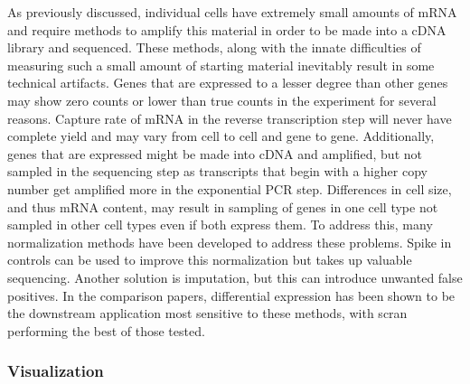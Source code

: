 \par{
As previously discussed, individual cells have extremely small amounts of mRNA and require methods to amplify this material in order to be made into a cDNA library and sequenced. These methods, along with the innate difficulties of measuring such a small amount of starting material inevitably result in some technical artifacts. Genes that are expressed to a lesser degree than other genes may show zero counts or lower than true counts in the experiment for several reasons\cite{technoise}. Capture rate of mRNA in the reverse transcription step will never have complete yield and may vary from cell to cell and gene to gene. Additionally, genes that are expressed might be made into cDNA and amplified, but not sampled in the sequencing step as transcripts that begin with a higher copy number get amplified more in the exponential PCR step. Differences in cell size, and thus mRNA content, may result in sampling of genes in one cell type not sampled in other cell types even if both express them. To address this, many normalization methods have been developed\cite{normalize1}\cite{normalize2} to address these problems. Spike in controls can be used to improve this normalization\cite{marioni1} but takes up valuable sequencing. Another solution is imputation\cite{imputesc}, but this can introduce unwanted false positives\cite{fpimpute}. In the comparison papers, differential expression has been shown to be the downstream application most sensitive to these methods\cite{normalsc}, with scran\cite{scran} performing the best of those tested.
}

\subsubsection{Visualization}

